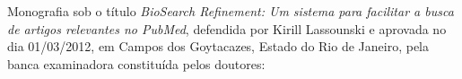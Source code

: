 \begin{titlepage}
\begin{folhadeaprovacao}
    Monografia sob o título \textit{BioSearch Refinement: Um sistema para facilitar a busca de artigos relevantes no PubMed}, defendida por Kirill Lassounski e aprovada no dia 01/03/2012, em Campos dos Goytacazes, Estado do Rio de Janeiro, pela banca examinadora constituída pelos doutores:
    \setlength{\ABNTsignthickness}{0.4pt}
    \setlength{\ABNTsignskip}{2cm}

\end{folhadeaprovacao}
\end{titlepage}
